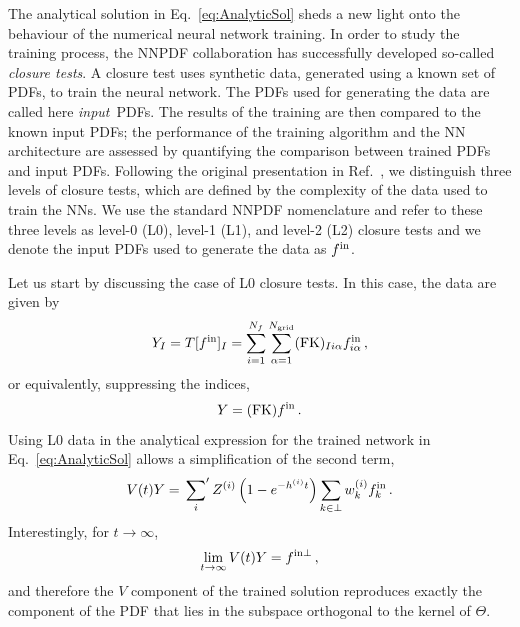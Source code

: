 The analytical solution in Eq.~\eqref{eq:AnalyticSol} sheds a new light onto the
behaviour of the numerical neural network training. In order to study the
training process, the NNPDF collaboration has successfully developed so-called
{\em closure tests}. A closure test uses synthetic data, generated using a known
set of PDFs, to train the neural network. The PDFs used for generating the data
are called here {\em input}\ PDFs. The results of the training are then compared
to the known input PDFs; the performance of the training algorithm and the NN
architecture are assessed by quantifying the comparison between trained PDFs and
input PDFs. Following the original presentation in Ref.~\cite{NNPDF:2014otw}, we
distinguish three levels of closure tests, which are defined by the complexity
of the data used to train the NNs. We use the standard NNPDF nomenclature and
refer to these three levels as level-0 (L0), level-1 (L1), and level-2 (L2)
closure tests and we denote the input PDFs used to generate the data as $f^{\rm in}$.

Let us start by discussing the case of L0 closure tests. In this case, the data are
given by
\begin{equation}
    \label{eq:DataL0}
    Y_I = T[f^{\rm in}]_I
        = \sum_{i=1}^{N_{f}} \sum_{\alpha=1}^{N_{\mathrm{grid}}} (\mathrm{FK})_{Ii\alpha} f^{\rm in}_{i\alpha}\, ,
\end{equation}
or equivalently, suppressing the indices,
\begin{equation}
    \label{eq:DataL0NoIndices}
    Y = (\mathrm{FK}) f^{\rm in}\, .
\end{equation}
Using L0 data in the analytical expression for the trained network in
Eq.~\eqref{eq:AnalyticSol} allows a simplification of the second term,
\begin{align}
    \label{eq:L0ClosureTrained}
    V(t) Y = \sideset{}{'}\sum_{i} Z^{(i)} \left(1 - e^{-h^{(i)}t}\right)
        \sum_{k\in\perp} w^{(i)}_k f^{\rm in}_k\, .
\end{align}
Interestingly, for $t\to\infty$,
\begin{align}
    \label{eq:L0ClosureInfiniteTraining}
    \lim_{t\to\infty} V(t) Y = f^{\rm in \perp}\, ,
\end{align}
and therefore the $V$ component of the trained solution reproduces exactly the
component of the PDF that lies in  the subspace orthogonal to the kernel of
$\Theta$.


